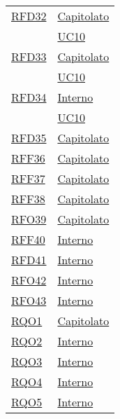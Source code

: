 \begin{longtable}{|>{\centering}m{5cm}|m{5cm}<{\centering}|}
\hyperlink{RFD32}{RFD32} & \hyperlink{Capitolato}{Capitolato}\\
& \hyperref[UC10]{UC10}\\ \hline

\hyperlink{RFD33}{RFD33} & \hyperlink{Capitolato}{Capitolato}\\
& \hyperref[UC10]{UC10}\\ \hline

\hyperlink{RFD34}{RFD34} & \hyperlink{Interno}{Interno}\\
& \hyperref[UC10]{UC10}\\ \hline

\hyperlink{RFD35}{RFD35} & \hyperlink{Capitolato}{Capitolato}\\ \hline

\hyperlink{RFF36}{RFF36} & \hyperlink{Capitolato}{Capitolato}\\ \hline

\hyperlink{RFF37}{RFF37} & \hyperlink{Capitolato}{Capitolato}\\ \hline

\hyperlink{RFF38}{RFF38} & \hyperlink{Capitolato}{Capitolato}\\ \hline

\hyperlink{RFO39}{RFO39} & \hyperlink{Capitolato}{Capitolato}\\ \hline

\hyperlink{RFF40}{RFF40} & \hyperlink{Interno}{Interno}\\ \hline

\hyperlink{RFD41}{RFD41} & \hyperlink{Interno}{Interno}\\ \hline

\hyperlink{RFO42}{RFO42} & \hyperlink{Interno}{Interno}\\ \hline

\hyperlink{RFO43}{RFO43} & \hyperlink{Interno}{Interno}\\ \hline

\hyperlink{RQO1}{RQO1} & \hyperlink{Capitolato}{Capitolato}\\ \hline

\hyperlink{RQO2}{RQO2} & \hyperlink{Interno}{Interno}\\ \hline

\hyperlink{RQO3}{RQO3} & \hyperlink{Interno}{Interno}\\ \hline

\hyperlink{RQO4}{RQO4} & \hyperlink{Interno}{Interno}\\ \hline

\hyperlink{RQO5}{RQO5} & \hyperlink{Interno}{Interno}\\ \hline


\end{longtable}
